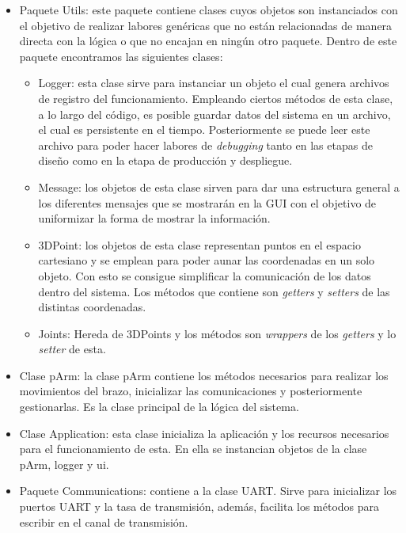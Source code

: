 \begin{itemize}
    \item Paquete Utils: este paquete contiene clases cuyos objetos son instanciados con el objetivo de realizar labores genéricas que no están relacionadas de manera directa con la lógica o que no encajan en ningún otro paquete. Dentro de este paquete encontramos las siguientes clases:
    \begin{itemize}
        \item Logger: esta clase sirve para instanciar un objeto el cual genera archivos de registro del funcionamiento. Empleando ciertos métodos de esta clase, a lo largo del código, es posible guardar datos del sistema en un archivo, el cual es persistente en el tiempo. Posteriormente se puede leer este archivo para poder hacer labores de \textit{debugging} tanto en las etapas de diseño como en la etapa de producción y despliegue.
        \item Message: los objetos de esta clase sirven para dar una estructura general a los diferentes mensajes que se mostrarán en la GUI con el objetivo de uniformizar la forma de mostrar la información.
        \item 3DPoint: los objetos de esta clase representan puntos en el espacio cartesiano y se emplean para poder aunar las coordenadas en un solo objeto. Con esto se consigue simplificar la comunicación de los datos dentro del sistema. Los métodos que contiene son \textit{getters} y \textit{setters} de las distintas coordenadas.
        \item Joints: Hereda de 3DPoints y los métodos son \textit{wrappers} de los \textit{getters} y lo \textit{setter} de esta.
    \end{itemize}
    \item Clase pArm: la clase pArm contiene los métodos necesarios para realizar los movimientos del brazo, inicializar las comunicaciones y posteriormente gestionarlas. Es la clase principal de la lógica del sistema.
    \item Clase Application: esta clase inicializa la aplicación y los recursos necesarios para el funcionamiento de esta. En ella se instancian objetos de la clase pArm, logger y ui.
    \item Paquete Communications: contiene a la clase UART. Sirve para inicializar los puertos UART y la tasa de transmisión, además, facilita los métodos para escribir en el canal de transmisión.
\end{itemize}

